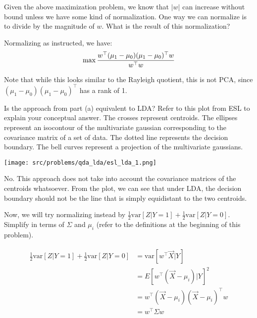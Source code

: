 \begin{Parts}

\Part Given the above maximization problem, we know that $|w|$ can increase without bound unless we have some kind of normalization.
One way we can normalize is to divide by the magnitude of $w$. What is the result of this normalization?

\begin{solution}
Normalizing as instructed, we have:
$$\max {w^\top (\mu_1 - \mu_0)(\mu_1 - \mu_0)^\top w \over w^\top w}$$

Note that while this looks similar to the Rayleigh quotient, this is not PCA, since $(\mu_1 - \mu_0)(\mu_1 - \mu_0)^\top$ has a rank of 1.

\end{solution}

\Part Is the approach from part (a) equivalent to LDA?
Refer to this plot from ESL to explain your conceptual answer. The crosses represent centroids. The ellipses represent an isocontour of the multivariate gaussian corresponding to the covariance matrix of a set of data.
The dotted line represents the decision boundary. The bell curves represent a projection of the multivariate gaussians.

\begin{center}
\texttt{[image: src/problems/qda\_lda/esl\_lda\_1.png]}
\end{center}

\begin{solution}
No. This approach does not take into account the covariance matrices of the centroids whatsoever.
From the plot, we can see that under LDA, the decision boundary should not be the line that is simply equidistant to the two centroids.
\end{solution}

\Part Now, we will try normalizing instead by $\frac{1}{2}\text{var}[Z|Y=1]+\frac{1}{2}\text{var}[Z|Y=0]$.
Simplify in terms of $\Sigma$ and $\mu_i$ (refer to the definitions at the beginning of this problem).

\begin{solution}
\begin{align*}
\begin{aligned}
\frac{1}{2}\text{var}[Z|Y=1]+\frac{1}{2}\text{var}[Z|Y=0] &= \text{var}[w^\top \vec{X} | Y] \\
&= E[w^\top(\vec{X}-\mu_i) | Y]^2 \\
&= w^\top(\vec{X}-\mu_i)(\vec{X}-\mu_i)^\top w \\
&= w^\top \Sigma w
\end{aligned}
\end{align*}


\end{solution}
\end{Parts}
